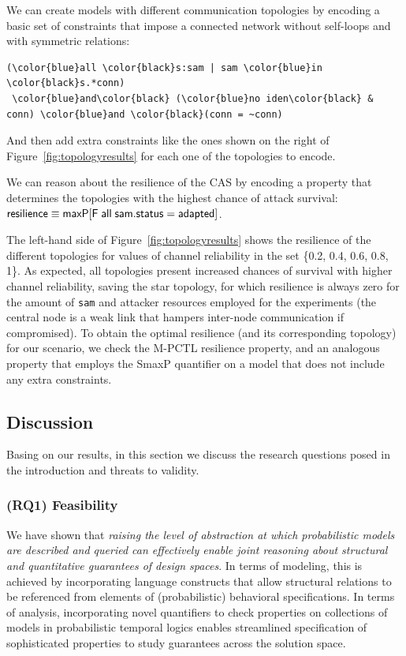 \documentclass[10pt,journal,compsoc]{IEEEtran}
\begin{document}
We can create models with different communication topologies by encoding a basic set of constraints that impose a connected network without self-loops and with symmetric relations:

{\scriptsize
 \begin{Verbatim}[commandchars=\\\{\},codes={\catcode`$=3\catcode`^=7\catcode`_=8}]
 (\color{blue}all \color{black}s:sam | sam \color{blue}in \color{black}s.*conn)
 \color{blue}and\color{black} (\color{blue}no iden\color{black} & conn) \color{blue}and \color{black}(conn = ~conn)
\end{Verbatim}
}

And then add extra constraints like the ones shown on the right of Figure~\ref{fig:topologyresults} for each one of the topologies to encode.

We can reason about the resilience of the CAS by encoding a property that determines the topologies with the highest chance of attack survival: ${\sf resilience \equiv maxP [F \; all\; sam.status=adapted]}$.




The left-hand side of Figure~\ref{fig:topologyresults} shows the resilience of the different topologies for values of channel reliability in the set \{0.2, 0.4, 0.6, 0.8, 1\}. 
As expected, all topologies present increased chances of survival with higher channel reliability, saving the star topology, for which resilience is always zero for the amount of {\tt sam} and attacker resources employed for the experiments (the central node is a weak link that hampers inter-node communication if compromised).
To obtain the optimal resilience (and its corresponding topology) for our scenario, we check the M-PCTL {\sf resilience} property, and an analogous property that employs the {\sf SmaxP} quantifier on a model that does not include any extra constraints. 


\subsection{Discussion}
Basing on our results, in this section we discuss the research questions posed in the introduction and threats to validity.
\subsubsection{(RQ1) Feasibility} We have shown that {\em raising the level of abstraction at which probabilistic models are described and queried can effectively enable joint reasoning about structural and quantitative guarantees of design spaces}. In terms of modeling, this is achieved by incorporating language constructs that allow structural relations to be referenced from elements of (probabilistic) behavioral specifications. In terms of analysis, incorporating novel quantifiers to check properties on collections of models in probabilistic temporal logics enables streamlined specification of sophisticated properties to study guarantees across the solution space.
\end{document}
